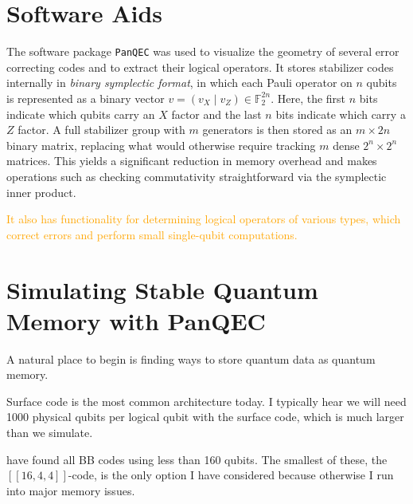 \section{Software Aids}
The software package \texttt{PanQEC} \cite{panqec2021} was used to visualize the geometry of several error correcting codes and to extract their logical operators. It stores stabilizer codes internally in \emph{binary symplectic format}, in which each Pauli operator on $n$ qubits is represented as a binary vector $v = (v_X \mid v_Z) \in \mathbb{F}_2^{2n}$. Here, the first $n$ bits indicate which qubits carry an $X$ factor and the last $n$ bits indicate which carry a $Z$ factor. A full stabilizer group with $m$ generators is then stored as an $m \times 2n$ binary matrix, replacing what would otherwise require tracking $m$ dense $2^n \times 2^n$ matrices. This yields a significant reduction in memory overhead and makes operations such as checking commutativity straightforward via the symplectic inner product.

\textcolor{orange}{It also has functionality for determining logical operators of various types, which correct errors and perform small single-qubit computations.}

\section{Simulating Stable Quantum Memory with PanQEC}
A natural place to begin is finding ways to store quantum data as quantum memory.

Surface code is the most common architecture today. I typically hear we will need 1000 physical qubits per logical qubit with the surface code, which is much larger than we simulate.


\textcite{liang2026selfdualbivariatebicyclecodes} have found all BB codes using less than 160 qubits. The smallest of these, the $[[16, 4, 4]]$-code, is the only option I have considered because otherwise I run into major memory issues.

